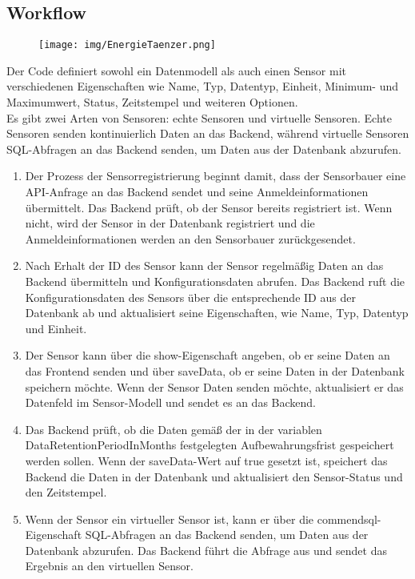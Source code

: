 \begin{flushleft}
\subsection{Workflow}

\begin{figure}[h]
	\centering
	\texttt{[image: img/EnergieTaenzer.png]}
	\caption{}
	\label{fig:example}
\end{figure}
Der Code definiert sowohl ein Datenmodell als auch einen Sensor mit verschiedenen Eigenschaften wie Name, Typ, Datentyp, Einheit, Minimum- und Maximumwert, Status, Zeitstempel und weiteren Optionen.\\
Es gibt zwei Arten von Sensoren: echte Sensoren und virtuelle Sensoren. Echte Sensoren senden kontinuierlich Daten an das Backend, während virtuelle Sensoren SQL-Abfragen an das Backend senden, um Daten aus der Datenbank abzurufen.
\\
\begin{enumerate}
	\item Der Prozess der Sensorregistrierung beginnt damit, dass der Sensorbauer eine API-Anfrage an das Backend sendet und seine Anmeldeinformationen übermittelt. Das Backend prüft, ob der Sensor bereits registriert ist. Wenn nicht, wird der Sensor in der Datenbank registriert und die Anmeldeinformationen werden an den Sensorbauer zurückgesendet.
	\item Nach Erhalt der ID des Sensor kann der Sensor regelmäßig Daten an das Backend übermitteln und Konfigurationsdaten abrufen. Das Backend ruft die Konfigurationsdaten des Sensors über die entsprechende ID aus der Datenbank ab und aktualisiert seine Eigenschaften, wie Name, Typ, Datentyp und Einheit.
	\item Der Sensor kann über die show-Eigenschaft angeben, ob er seine Daten an das Frontend senden und über saveData, ob er seine Daten in der Datenbank speichern möchte. Wenn der Sensor Daten senden möchte, aktualisiert er das Datenfeld im Sensor-Modell und sendet es an das Backend.
	\item Das Backend prüft, ob die Daten gemäß der in der variablen DataRetentionPeriodInMonths festgelegten Aufbewahrungsfrist gespeichert werden sollen. Wenn der saveData-Wert auf true gesetzt ist, speichert das Backend die Daten in der Datenbank und aktualisiert den Sensor-Status und den Zeitstempel.
	\item Wenn der Sensor ein virtueller Sensor ist, kann er über die commendsql-Eigenschaft SQL-Abfragen an das Backend senden, um Daten aus der Datenbank abzurufen. Das Backend führt die Abfrage aus und sendet das Ergebnis an den virtuellen Sensor.

\end{enumerate}
\end{flushleft}
